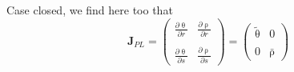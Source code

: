 Case closed, we find here too that 
\[
{\bm J}_{PL}=
\left(
\begin{array}{cc}
\frac{\partial \uptheta}{\partial r}  & 
\frac{\partial \uprho}{\partial r}  \\ \\
\frac{\partial \uptheta}{\partial s}  & 
\frac{\partial \uprho}{\partial s}
\end{array}
\right)
=
\left(
\begin{array}{cc}
\tilde{\uptheta}  &  0 \\\\
0 & \bar{\uprho}
\end{array}
\right)
\]



